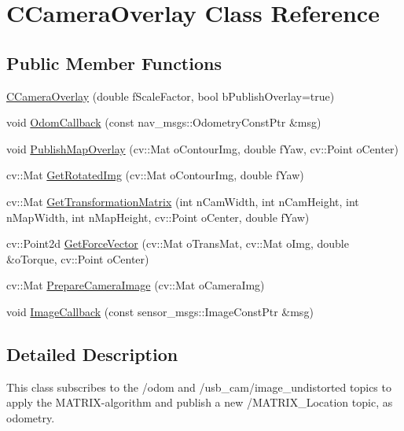 \hypertarget{classCCameraOverlay}{}\section{C\+Camera\+Overlay Class Reference}
\label{classCCameraOverlay}
\subsection*{Public Member Functions}
\begin{DoxyCompactItemize}
\item 
\hyperlink{classCCameraOverlay_af3bb4a64b788a48193a5bcf32ec9c48e}{C\+Camera\+Overlay} (double f\+Scale\+Factor, bool b\+Publish\+Overlay=true)
\item 
void \hyperlink{classCCameraOverlay_afacf6244e298a21c4f66cce388a1bba5}{Odom\+Callback} (const nav\+\_\+msgs\+::\+Odometry\+Const\+Ptr \&msg)
\item 
void \hyperlink{classCCameraOverlay_a181273515ad4fad3afeb0af94b4a8b9b}{Publish\+Map\+Overlay} (cv\+::\+Mat o\+Contour\+Img, double f\+Yaw, cv\+::\+Point o\+Center)
\item 
cv\+::\+Mat \hyperlink{classCCameraOverlay_a049c9d62c19daa861a64719c4ef6d741}{Get\+Rotated\+Img} (cv\+::\+Mat o\+Contour\+Img, double f\+Yaw)
\item 
cv\+::\+Mat \hyperlink{classCCameraOverlay_a84b8dfa74a28656b41b6701bc8c0876e}{Get\+Transformation\+Matrix} (int n\+Cam\+Width, int n\+Cam\+Height, int n\+Map\+Width, int n\+Map\+Height, cv\+::\+Point o\+Center, double f\+Yaw)
\item 
cv\+::\+Point2d \hyperlink{classCCameraOverlay_a36f4f263b03af8e1ceb0ed4c1e254316}{Get\+Force\+Vector} (cv\+::\+Mat o\+Trans\+Mat, cv\+::\+Mat o\+Img, double \&o\+Torque, cv\+::\+Point o\+Center)
\item 
cv\+::\+Mat \hyperlink{classCCameraOverlay_a487dec7bb2107637a0a5a98b343de7ff}{Prepare\+Camera\+Image} (cv\+::\+Mat o\+Camera\+Img)
\item 
void \hyperlink{classCCameraOverlay_aebf5afaca8892eb5af9c90531675427b}{Image\+Callback} (const sensor\+\_\+msgs\+::\+Image\+Const\+Ptr \&msg)
\end{DoxyCompactItemize}


\subsection{Detailed Description}
This class subscribes to the /odom and /usb\+\_\+cam/image\+\_\+undistorted topics to apply the M\+A\+T\+R\+I\+X-\/algorithm and publish a new /\+M\+A\+T\+R\+I\+X\+\_\+\+Location topic, as odometry. 

